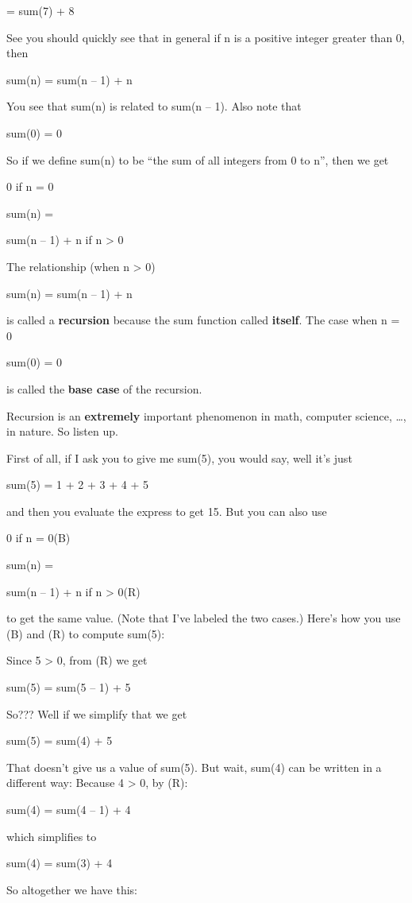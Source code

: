 \documentclass[
]{article}
\begin{document}
= sum(7) + 8

See you should quickly see that in general if n is a positive integer
greater than 0, then

sum(n) = sum(n -- 1) + n

You see that sum(n) is related to sum(n -- 1). Also note that

sum(0) = 0

So if we define sum(n) to be ``the sum of all integers from 0 to n'',
then we get

0 if n = 0

sum(n) =

sum(n -- 1) + n if n \textgreater{} 0

The relationship (when n \textgreater{} 0)

sum(n) = sum(n -- 1) + n

is called a \textbf{recursion} because the sum function called
\textbf{itself}. The case when n = 0

sum(0) = 0

is called the \textbf{base case} of the recursion.

Recursion is an \textbf{extremely} important phenomenon in math,
computer science, \ldots, in nature. So listen up.

First of all, if I ask you to give me sum(5), you would say, well it's
just

sum(5) = 1 + 2 + 3 + 4 + 5

and then you evaluate the express to get 15. But you can also use

0 if n = 0(B)

sum(n) =

sum(n -- 1) + n if n \textgreater{} 0(R)

to get the same value. (Note that I've labeled the two cases.) Here's
how you use (B) and (R) to compute sum(5):

Since 5 \textgreater{} 0, from (R) we get

sum(5) = sum(5 -- 1) + 5

So??? Well if we simplify that we get

sum(5) = sum(4) + 5

That doesn't give us a value of sum(5). But wait, sum(4) can be written
in a different way: Because 4 \textgreater{} 0, by (R):

sum(4) = sum(4 -- 1) + 4

which simplifies to

sum(4) = sum(3) + 4

So altogether we have this:
\end{document}
